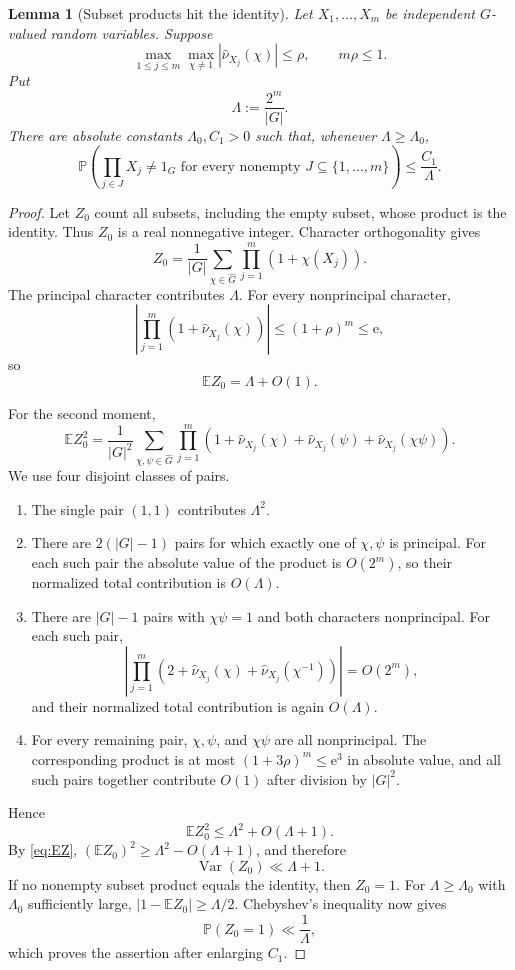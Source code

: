 \documentclass[11pt]{amsart}
\newtheorem{lemma}[lemma]{Lemma}
\theoremstyle{definition}
\theoremstyle{remark}
\numberwithin{equation}{section}
\newcommand{\e}{\mathrm e}
\begin{document}
\begin{lemma}[Subset products hit the identity]\label{lem:subset-product}
Let $X_1,\ldots,X_m$ be independent $G$-valued random variables.  Suppose
\[
 \max_{1\le j\le m}\max_{\chi\ne1}
 |\widehat\nu_{X_j}(\chi)|\le\rho,
 \qquad m\rho\le1.
\]
Put
\[
 \Lambda:=\frac{2^m}{|G|}.
\]
There are absolute constants $\Lambda_0,C_1>0$ such that, whenever
$\Lambda\ge\Lambda_0$,
\[
 \mathbb P\left(
 \prod_{j\in J}X_j\ne1_G
 \text{ for every nonempty }J\subseteq\{1,\ldots,m\}
 \right)
 \le\frac{C_1}{\Lambda}.
\]
\end{lemma}

\begin{proof}
Let $Z_0$ count all subsets, including the empty subset, whose product is
the identity.  Thus $Z_0$ is a real nonnegative integer.  Character
orthogonality gives
\[
 Z_0=\frac1{|G|}\sum_{\chi\in\widehat G}
 \prod_{j=1}^m(1+\chi(X_j)).
\]
The principal character contributes $\Lambda$.  For every nonprincipal
character,
\[
 \left|\prod_{j=1}^m(1+\widehat\nu_{X_j}(\chi))\right|
 \le(1+\rho)^m\le\e,
\]
so
\begin{equation}\label{eq:EZ}
 \mathbb EZ_0=\Lambda+O(1).
\end{equation}

For the second moment,
\[
 \mathbb EZ_0^2
 =\frac1{|G|^2}\sum_{\chi,\psi\in\widehat G}
 \prod_{j=1}^m
 \left(1+\widehat\nu_{X_j}(\chi)
 +\widehat\nu_{X_j}(\psi)
 +\widehat\nu_{X_j}(\chi\psi)\right).
\]
We use four disjoint classes of pairs.
\begin{enumerate}[label=\textnormal{(\roman*)},leftmargin=2.5em]
\item The single pair $(1,1)$ contributes $\Lambda^2$.
\item There are $2(|G|-1)$ pairs for which exactly one of $\chi,\psi$
 is principal.  For each such pair the absolute value of the product is $O(2^m)$, so their
 normalized total contribution is $O(\Lambda)$.
\item There are $|G|-1$ pairs with $\chi\psi=1$ and both characters
 nonprincipal.  For each such pair,
 \[
  \left|\prod_{j=1}^m\left(2+\widehat\nu_{X_j}(\chi)
  +\widehat\nu_{X_j}(\chi^{-1})\right)\right|=O(2^m),
 \]
 and their normalized total contribution is again $O(\Lambda)$.
\item For every remaining pair, $\chi,\psi$, and $\chi\psi$ are all
 nonprincipal.  The corresponding product is at most
 $(1+3\rho)^m\le\e^3$ in absolute value, and all such pairs together
 contribute $O(1)$ after division by $|G|^2$.
\end{enumerate}
Hence
\[
 \mathbb EZ_0^2\le\Lambda^2+O(\Lambda+1).
\]
By \eqref{eq:EZ},
$(\mathbb EZ_0)^2\ge\Lambda^2-O(\Lambda+1)$, and therefore
\[
 \operatorname{Var}(Z_0)\ll\Lambda+1.
\]
If no nonempty subset product equals the identity, then $Z_0=1$.
For $\Lambda\ge\Lambda_0$ with $\Lambda_0$ sufficiently large,
$|1-\mathbb EZ_0|\ge\Lambda/2$.  Chebyshev's inequality now gives
\[
 \mathbb P(Z_0=1)\ll\frac1\Lambda,
\]
which proves the assertion after enlarging $C_1$.
\end{proof}
\end{document}
